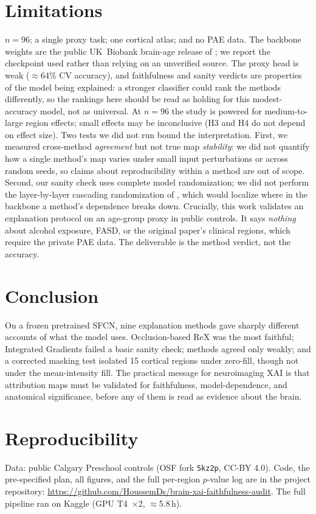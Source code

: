 \documentclass[11pt]{article}
\begin{document}
\section{Limitations}
\label{sec:limits}
$n=96$; a single proxy task; one cortical atlas; and no PAE data. The backbone weights are the
public UK~Biobank brain-age release of \citet{peng2021} \citep{sfcnweights}; we report the
checkpoint used rather than relying on an unverified source. The proxy head is weak
($\approx$64\% CV accuracy), and faithfulness and sanity verdicts are properties of the
model being explained: a stronger classifier could rank the methods differently, so the
rankings here should be read as holding for this modest-accuracy model, not as universal. At
$n=96$ the study is powered for medium-to-large region
effects; small effects may be inconclusive (H3 and H4 do not depend on effect size). Two tests
we did not run bound the interpretation. First, we measured cross-method \emph{agreement} but
not true map \emph{stability}: we did not quantify how a single method's map varies under small
input perturbations or across random seeds, so claims about reproducibility within a method are
out of scope. Second, our sanity check uses complete model randomization; we did not perform the
layer-by-layer cascading randomization of \citet{adebayo2018}, which would localize where in the
backbone a method's dependence breaks down. Crucially, this work validates an explanation
protocol on an age-group proxy in public controls. It says \emph{nothing} about alcohol exposure,
FASD, or the original paper's clinical regions, which require the private PAE data. The
deliverable is the method verdict, not the accuracy.

\section{Conclusion}
On a frozen pretrained SFCN, nine explanation methods gave sharply different accounts of what
the model uses. Occlusion-based ReX was the most faithful; Integrated Gradients failed a basic
sanity check; methods agreed only weakly; and a corrected masking test isolated 15 cortical
regions under zero-fill, though not under the mean-intensity fill. The practical message for
neuroimaging XAI is that attribution maps must be validated
for faithfulness, model-dependence, and anatomical significance, before any of them is
read as evidence about the brain.

\section*{Reproducibility}
Data: public Calgary Preschool controls (OSF fork \texttt{5kz2p}, CC-BY 4.0). Code, the
pre-specified plan, all figures, and the full per-region $p$-value log are in the project
repository: \url{https://github.com/HoussemDs/brain-xai-faithfulness-audit}. The full pipeline
ran on Kaggle (GPU T4~$\times$2, $\approx$5.8\,h).
\end{document}
